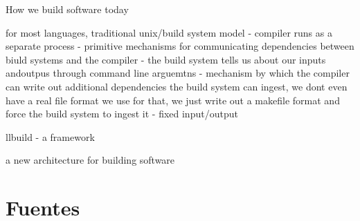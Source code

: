 How we build software today

for most languages, traditional unix/build system model
- compiler runs as a separate process
- primitive mechanisms for communicating dependencies between biuld systems and the compiler
  - the build system tells us about our inputs andoutpus through command line arguemtns
  - mechanism by which the compiler can write out additional dependencies the build system can ingest, we dont even have a real file format we use for that, we just write out a makefile format and force the build system to ingest it
  - fixed input/output

llbuild - a framework

a new architecture for building software

\section*{Fuentes}

